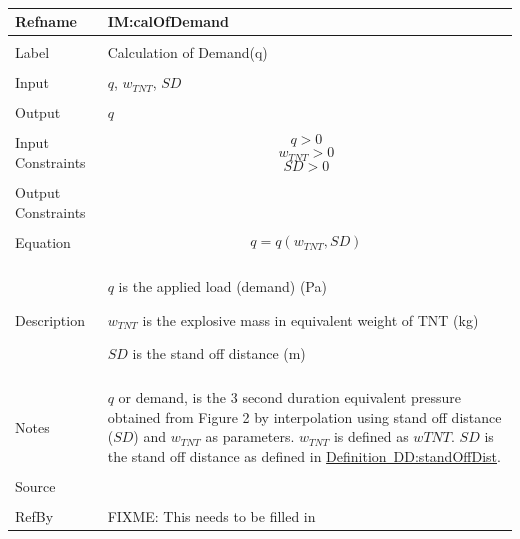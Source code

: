 \documentclass[12pt]{article}
\begin{document}
~\newline
\noindent \begin{minipage}{\textwidth}
\begin{tabular}{p{} p{}}
\toprule \textbf{Refname} & \textbf{IM:calOfDemand}
\label{IM:calOfDemand}
\\ \midrule \\
Label & Calculation of Demand(q)
\\ \midrule \\
Input & $q$, ${w_{TNT}}$, $SD$
\\ \midrule \\
Output & $q$
\\ \midrule \\
Input Constraints & \begin{dmath}
                    q>0
                    \end{dmath}
                    \begin{dmath}
                    {w_{TNT}}>0
                    \end{dmath}
                    \begin{dmath}
                    SD>0
                    \end{dmath}
\\ \midrule \\
Output Constraints & 
\\ \midrule \\
Equation & \begin{dmath}
           q=q\left({w_{TNT}},SD\right)
           \end{dmath}
\\ \midrule \\
Description & \begin{symbDescription}
              \item{$q$ is the applied load (demand) (Pa)}
              \item{${w_{TNT}}$ is the explosive mass in equivalent weight of TNT (kg)}
              \item{$SD$ is the stand off distance (m)}
              \end{symbDescription}
\\ \midrule \\
Notes & $q$ or demand, is the 3 second duration equivalent pressure obtained from Figure 2 by interpolation using stand off distance ($SD$) and ${w_{TNT}}$ as parameters. ${w_{TNT}}$ is defined as $w TNT$. $SD$ is the stand off distance as defined in \hyperref[DD:standOffDist]{Definition~DD:standOffDist}.
\\ \midrule \\
Source & 
\\ \midrule \\
RefBy & FIXME: This needs to be filled in
\\ \bottomrule \end{tabular}
\end{minipage}\\
\end{document}
